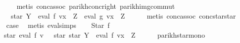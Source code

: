 \begin{isabellebody}
\ \ \ \ \isamarkupfalse%
\ {\isacharparenleft}{\kern0pt}metis\ conc{\isacharunderscore}{\kern0pt}assoc\ parikh{\isacharunderscore}{\kern0pt}conc{\isacharunderscore}{\kern0pt}right\ parikh{\isacharunderscore}{\kern0pt}img{\isacharunderscore}{\kern0pt}commut{\isacharparenright}{\kern0pt}\isanewline
\ \ \isamarkupfalse%
\ \isamarkupfalse%
\ {\isachardoublequoteopen}{\isasymdots}\ {\isacharequal}{\kern0pt}\ {\isasymPsi}\ {\isacharparenleft}{\kern0pt}star\ Y\ {\isacharat}{\kern0pt}{\isacharat}{\kern0pt}\ eval\ f\ {\isacharparenleft}{\kern0pt}v{\isacharparenleft}{\kern0pt}x\ {\isacharcolon}{\kern0pt}{\isacharequal}{\kern0pt}\ Z{\isacharparenright}{\kern0pt}{\isacharparenright}{\kern0pt}\ {\isacharat}{\kern0pt}{\isacharat}{\kern0pt}\ eval\ g\ {\isacharparenleft}{\kern0pt}v{\isacharparenleft}{\kern0pt}x\ {\isacharcolon}{\kern0pt}{\isacharequal}{\kern0pt}\ Z{\isacharparenright}{\kern0pt}{\isacharparenright}{\kern0pt}{\isacharparenright}{\kern0pt}{\isachardoublequoteclose}\isanewline
\ \ \ \ \isamarkupfalse%
\ {\isacharparenleft}{\kern0pt}metis\ conc{\isacharunderscore}{\kern0pt}assoc\ conc{\isacharunderscore}{\kern0pt}star{\isacharunderscore}{\kern0pt}star{\isacharparenright}{\kern0pt}\isanewline
\ \ \isamarkupfalse%
\ \isamarkupfalse%
\ {\isacharquery}{\kern0pt}case\ \isamarkupfalse%
\ {\isacharparenleft}{\kern0pt}metis\ eval{\isachardot}{\kern0pt}simps{\isacharparenleft}{\kern0pt}{}{\isacharparenright}{\kern0pt}{\isacharparenright}{\kern0pt}\isanewline
{}\isamarkupfalse%
\isanewline
\ \ \isamarkupfalse%
\ {\isacharparenleft}{\kern0pt}Star\ f{\isacharparenright}{\kern0pt}\isanewline
\ \ \isamarkupfalse%
\ \isamarkupfalse%
\ {\isachardoublequoteopen}{\isasymPsi}\ {\isacharparenleft}{\kern0pt}star\ {\isacharparenleft}{\kern0pt}eval\ f\ v{\isacharparenright}{\kern0pt}{\isacharparenright}{\kern0pt}\ {\isasymsubseteq}\ {\isasymPsi}\ {\isacharparenleft}{\kern0pt}star\ {\isacharparenleft}{\kern0pt}star\ Y\ {\isacharat}{\kern0pt}{\isacharat}{\kern0pt}\ eval\ f\ {\isacharparenleft}{\kern0pt}v{\isacharparenleft}{\kern0pt}x\ {\isacharcolon}{\kern0pt}{\isacharequal}{\kern0pt}\ Z{\isacharparenright}{\kern0pt}{\isacharparenright}{\kern0pt}{\isacharparenright}{\kern0pt}{\isacharparenright}{\kern0pt}{\isachardoublequoteclose}\isanewline
\ \ \ \ \isamarkupfalse%
\ parikh{\isacharunderscore}{\kern0pt}star{\isacharunderscore}{\kern0pt}mono\ \isamarkupfalse%

\end{isabellebody}
